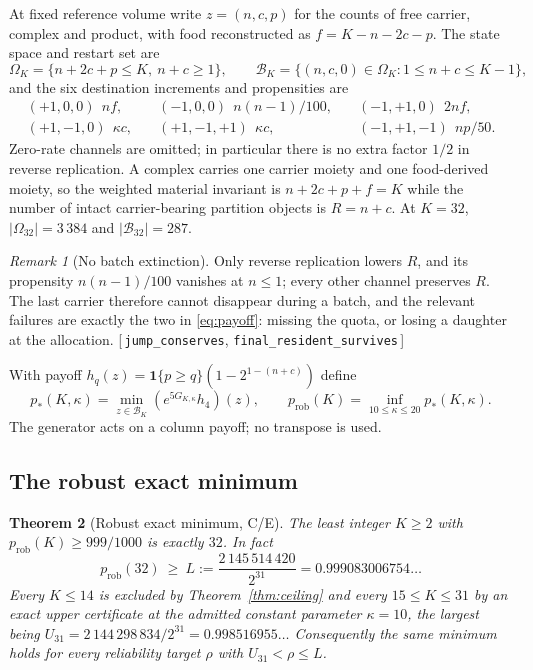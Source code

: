\documentclass[11pt]{article}
\theoremstyle{plain}
\newtheorem{theorem}{Theorem}[section]
\theoremstyle{definition}
\theoremstyle{remark}
\newtheorem{remark}[theorem]{Remark}
\newcommand{\one}{\mathbf{1}}
\newcommand{\leanref}[1]{{\normalfont\sffamily\footnotesize[\,#1\,]}}
\begin{document}
At fixed reference volume write $z=(n,c,p)$ for the counts of free carrier,
complex and product, with food reconstructed as $f=K-n-2c-p$. The state space
and restart set are
\begin{equation}
\Omega_K=\{n+2c+p\le K,\ n+c\ge1\},\qquad
\mathcal{B}_K=\{(n,c,0)\in\Omega_K:1\le n+c\le K-1\},
\end{equation}
and the six destination increments and propensities are
\begin{equation}\label{eq:channels}
\begin{array}{llll}
(+1,0,0)\ \ nf, &\quad (-1,0,0)\ \ n(n-1)/100, &\quad (-1,+1,0)\ \ 2nf,\\[2pt]
(+1,-1,0)\ \ \kappa c, &\quad (+1,-1,+1)\ \ \kappa c, &\quad
(-1,+1,-1)\ \ np/50 .
\end{array}
\end{equation}
Zero-rate channels are omitted; in particular there is no extra factor $1/2$
in reverse replication. A complex carries one carrier moiety and one
food-derived moiety, so the weighted material invariant is $n+2c+p+f=K$ while
the number of intact carrier-bearing partition objects is $R=n+c$. At $K=32$,
$|\Omega_{32}|=3\,384$ and $|\mathcal{B}_{32}|=287$.

\begin{remark}[No batch extinction]
Only reverse replication lowers $R$, and its propensity $n(n-1)/100$ vanishes
at $n\le1$; every other channel preserves $R$. The last carrier therefore
cannot disappear during a batch, and the relevant failures are exactly the two
in \eqref{eq:payoff}: missing the quota, or losing a daughter at the
allocation. \leanref{\texttt{jump\_conserves},
\texttt{final\_resident\_survives}}
\end{remark}

With payoff $h_q(z)=\one\{p\ge q\}(1-2^{1-(n+c)})$ define
\begin{equation}
p_*(K,\kappa)=\min_{z\in\mathcal{B}_K}(e^{5G_{K,\kappa}}h_4)(z),
\qquad
p_{\mathrm{rob}}(K)=\inf_{10\le\kappa\le20}p_*(K,\kappa).
\end{equation}
The generator acts on a column payoff; no transpose is used.

\subsection{The robust exact minimum}

\begin{theorem}[Robust exact minimum, C/E]\label{thm:min32}
The least integer $K\ge2$ with $p_{\mathrm{rob}}(K)\ge999/1000$ is exactly
$32$. In fact
\begin{equation}\label{eq:L}
p_{\mathrm{rob}}(32)\ \ge\ L:=\frac{2\,145\,514\,420}{2^{31}}
=0.999083006754\ldots
\end{equation}
Every $K\le14$ is excluded by Theorem~\ref{thm:ceiling} and every
$15\le K\le31$ by an exact upper certificate at the admitted constant
parameter $\kappa=10$, the largest being
$U_{31}=2\,144\,298\,834/2^{31}=0.998516955\ldots$ Consequently the same
minimum holds for every reliability target $\rho$ with
$U_{31}<\rho\le L$.
\end{theorem}
\end{document}
